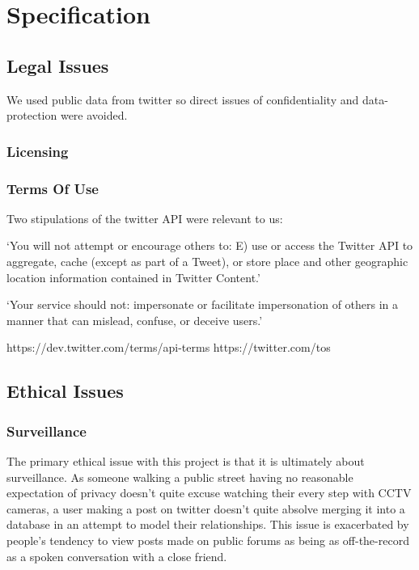 \chapter{Specification}

\section{Legal Issues}

We used public data from twitter so direct issues of confidentiality and data-protection were avoided.

\subsection{Licensing}



\subsection{Terms Of Use}

Two stipulations of the twitter API were relevant to us:

`You will not attempt or encourage others to: E) use or access the Twitter API to aggregate, cache (except as part of a Tweet), or store place and other geographic location information contained in Twitter Content.'

`Your service should not: impersonate or facilitate impersonation of others in a manner that can mislead, confuse, or deceive users.'

https://dev.twitter.com/terms/api-terms
https://twitter.com/tos

\section{Ethical Issues}

\subsection{Surveillance}
The primary ethical issue with this project is that it is ultimately about surveillance. As someone walking a public street having no reasonable expectation of privacy doesn't quite excuse watching their every step with CCTV cameras, a user making a post on twitter doesn't quite absolve merging it into a database in an attempt to model their relationships. This issue is exacerbated by people's tendency to view posts made on public forums as being as off-the-record as a spoken conversation with a close friend.

